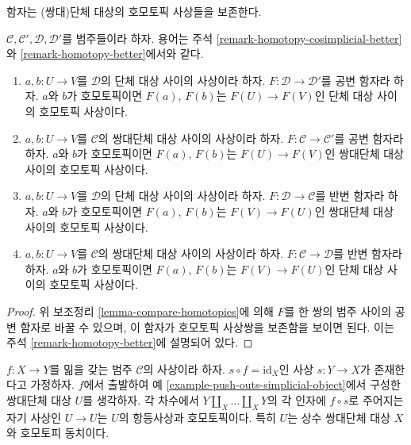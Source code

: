 \begin{lemma}
\label{lemma-functorial-homotopy}
\begin{slogan}
함자는 (쌍대)단체 대상의 호모토픽 사상들을 보존한다.
\end{slogan}
$\mathcal{C}, \mathcal{C}', \mathcal{D}, \mathcal{D}'$를 범주들이라 하자.
용어는 주석 \ref{remark-homotopy-cosimplicial-better}와
\ref{remark-homotopy-better}에서와 같다.
\begin{enumerate}
\item $a, b : U \to V$를 $\mathcal{D}$의 단체 대상 사이의 사상이라 하자.
$F : \mathcal{D} \to \mathcal{D}'$를 공변 함자라 하자. $a$와 $b$가
호모토픽이면 $F(a)$, $F(b)$는 $F(U) \to F(V)$인 단체 대상 사이의
호모토픽 사상이다.
\item $a, b : U \to V$를 $\mathcal{C}$의 쌍대단체 대상 사이의
사상이라 하자. $F : \mathcal{C} \to \mathcal{C}'$를 공변 함자라 하자.
$a$와 $b$가 호모토픽이면 $F(a)$, $F(b)$는 $F(U) \to F(V)$인
쌍대단체 대상 사이의 호모토픽 사상이다.
\item $a, b : U \to V$를 $\mathcal{D}$의 단체 대상 사이의 사상이라 하자.
$F : \mathcal{D} \to \mathcal{C}$를 반변 함자라 하자. $a$와 $b$가
호모토픽이면 $F(a)$, $F(b)$는 $F(V) \to F(U)$인 쌍대단체 대상 사이의
호모토픽 사상이다.
\item $a, b : U \to V$를 $\mathcal{C}$의 쌍대단체 대상 사이의
사상이라 하자. $F : \mathcal{C} \to \mathcal{D}$를 반변 함자라 하자.
$a$와 $b$가 호모토픽이면 $F(a)$, $F(b)$는 $F(V) \to F(U)$인
단체 대상 사이의 호모토픽 사상이다.
\end{enumerate}
\end{lemma}

\begin{proof}
위 보조정리 \ref{lemma-compare-homotopies}에 의해 $F$를 한 쌍의 범주
사이의 공변 함자로 바꿀 수 있으며, 이 함자가 호모토픽 사상쌍을
보존함을 보이면 된다. 이는 주석 \ref{remark-homotopy-better}에 설명되어 있다.
\end{proof}

\begin{lemma}
\label{lemma-push-outs-simplicial-object-w-section}
$f : X \to Y$를 밂을 갖는 범주 $\mathcal{C}$의 사상이라 하자.
$s \circ f = \text{id}_X$인 사상 $s : Y \to X$가 존재한다고 가정하자.
$f$에서 출발하여 예 \ref{example-push-outs-simplicial-object}에서 구성한
쌍대단체 대상 $U$를 생각하자. 각 차수에서 $Y \amalg_X \ldots \amalg_X Y$의
각 인자에 $f \circ s$로 주어지는 자기 사상인 $U \to U$는 $U$의
항등사상과 호모토픽이다. 특히 $U$는 상수 쌍대단체 대상 $X$와
호모토피 동치이다.
\end{lemma}

